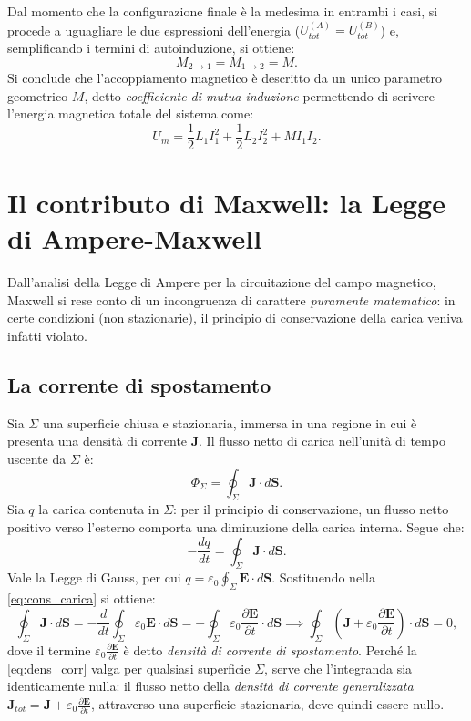 \documentclass[a4paper,11pt]{report}
\begin{document}
Dal momento che la configurazione finale è la medesima in entrambi i casi, si procede a uguagliare le due espressioni dell'energia ($U_{tot}^{(A)} = U_{tot}^{(B)}$) e, semplificando i termini di autoinduzione, si ottiene:
\begin{equation}
M_{2\rightarrow 1} = M_{1\rightarrow 2} = M.
\end{equation}
Si conclude che l'accoppiamento magnetico è descritto da un unico parametro geometrico $M$, detto \textit{coefficiente di mutua induzione} permettendo di scrivere l'energia magnetica totale del sistema come:
\begin{equation}
U_m = \frac{1}{2}L_1 I_1^2 + \frac{1}{2}L_2 I_2^2 + M I_1 I_2.
\end{equation}

\section{Il contributo di Maxwell: la Legge di Ampere-Maxwell}
Dall'analisi della Legge di Ampere per la circuitazione del campo magnetico, Maxwell si rese conto di un incongruenza di carattere \textit{puramente matematico}: in certe condizioni (non stazionarie), il principio di conservazione della carica veniva infatti violato. 

\subsection{La corrente di spostamento} 
Sia $\Sigma$ una superficie chiusa e stazionaria, immersa in una regione in cui è presenta una densità di corrente $\bm{J}$. Il flusso netto di carica nell'unità di tempo uscente da $\Sigma$ è:
\begin{equation}
\Phi _\Sigma = \oint_\Sigma \bm{J} \cdot d\bm{S}.
\end{equation}
Sia $q$ la carica contenuta in $\Sigma$: per il principio di conservazione, un flusso netto positivo verso l'esterno comporta una diminuzione della carica interna. Segue che:
\begin{equation}
-\frac{dq}{dt} = \oint_\Sigma \bm{J} \cdot d\bm{S}.
\label{eq:cons_carica}
\end{equation}
Vale la Legge di Gauss, per cui $q =\varepsilon_0 \oint_\Sigma \bm{E}\cdot d\bm{S}$. Sostituendo nella \eqref{eq:cons_carica} si ottiene:
\begin{equation}
\oint_\Sigma \bm{J} \cdot d\bm{S} = -\frac{d}{dt} \oint_\Sigma \varepsilon_0\bm{E}\cdot d\bm{S} = -\oint_\Sigma \varepsilon_0\frac{\partial\bm{E}}{\partial t} \cdot d\bm{S} \implies \oint_\Sigma \left(\bm{J} + \varepsilon_0\frac{\partial\bm{E}}{\partial t} \right)\cdot d\bm{S}  = 0,
\label{eq:dens_corr}
\end{equation}
dove il termine $\varepsilon_0\frac{\partial\bm{E}}{\partial t} $ è detto \textit{densità di corrente di spostamento}. Perché la \eqref{eq:dens_corr} valga per qualsiasi superficie $\Sigma$, serve che l'integranda sia identicamente nulla: il flusso netto della \textit{densità di corrente generalizzata} $\bm{J}_{tot} = \bm{J} + \varepsilon_0\frac{\partial\bm{E}}{\partial t}$, attraverso una superficie stazionaria, deve quindi essere nullo.   
\end{document}
